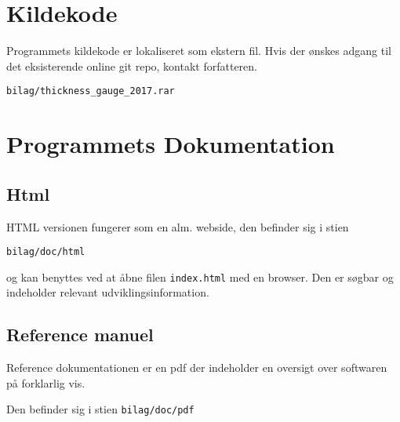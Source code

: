 \appendix

\section{Kildekode}
Programmets kildekode er lokaliseret som ekstern fil.
Hvis der ønskes adgang til det eksisterende online git repo, kontakt forfatteren.

\texttt{bilag/thickness\_gauge\_2017.rar}

\section{Programmets Dokumentation}

\subsection{Html}

HTML versionen fungerer som en alm. webside, den befinder sig i stien

\texttt{bilag/doc/html}

og kan benyttes ved at åbne filen \texttt{index.html} med en browser. Den er søgbar og indeholder relevant udviklingsinformation.

\subsection{Reference manuel}

Reference dokumentationen er en pdf der indeholder en oversigt over softwaren på forklarlig vis.

Den befinder sig i stien \texttt{bilag/doc/pdf}
